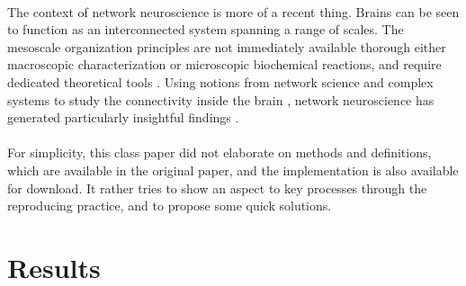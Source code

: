 \documentclass{article}
\begin{document}
\paragraph{}
The context of network neuroscience \cite{bassett_network_2017} is more of a recent thing. 
Brains can be seen to function as an interconnected system spanning a range of scales. The mesoscale organization principles are not immediately available thorough either macroscopic characterization or microscopic biochemical reactions, and require dedicated theoretical tools \cite{betzel_diversity_2018}.
Using notions from network science and complex systems to study the connectivity inside the brain \cite{rubinov_complex_2010}, network neuroscience has generated particularly insightful findings \cite{bullmore_complex_2009}. 
\paragraph{}
For simplicity, this class paper did not elaborate on methods and definitions, which are available in the original paper, and the implementation is also available for download. It rather tries to show an aspect to key processes through the reproducing practice, and to propose some quick solutions.

\section*{Results}
\end{document}
